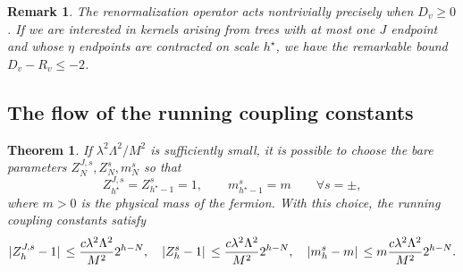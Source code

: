 \documentclass[a4paper, 11pt]{article}
\newcommand{\cutoff}{\Lambda}								%
\theoremstyle{thm}
\newtheorem{theorem}{Theorem}
\newtheorem{rmk}{Remark}
\begin{document}
\begin{rmk}
\label{rmk:gain}
The renormalization operator acts nontrivially \emph{precisely} when $D_v \ge 0$. If we are interested in kernels arising from trees with at most one $J$ endpoint and whose $\eta$ endpoints are contracted on scale $h^\star$, we have the remarkable bound $D_v -R_v \le -2$.
\end{rmk}

\subsection{The flow of the running coupling constants}
\label{subsec:rcc}

\begin{theorem}
\label{th:bare_constants}
If $\lambda^2 \cutoff^2/M^2$ is sufficiently small, it is possible to choose the bare parameters $Z^{J, s}_N, Z^s_N, m^s_N$ so that
\begin{equation}
\label{eq:rcc_fixing}
Z^{J, s}_{h^\star} = Z^s_{h^\star-1} = 1, \qquad m^s_{h^\star-1} = m \qquad \forall s = \pm,
\end{equation}
where $m > 0$ is the physical mass of the fermion. With this choice, the running coupling constants satisfy
\begin{equation}
\label{eq:rcc_bounds}
\abs*{Z^{J, s}_h - 1} \le \frac{c \lambda^2 \cutoff^2}{M^2} 2^{h - N}, \quad \abs*{Z^s_h - 1} \le \frac{c \lambda^2 \cutoff^2}{M^2} 2^{h - N}, \quad \abs*{m^s_h - m} \le m\frac{c \lambda^2 \cutoff^2}{M^2} 2^{h - N}.
\end{equation}
\end{theorem}
\end{document}
